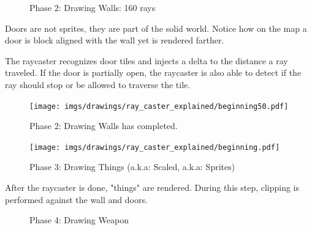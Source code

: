  
\begin{figure}[H]
 \centering
 \caption{Phase 2: Drawing Walls: 160 rays}  
\end{figure}
 \begin{minipage}{.4\textwidth}
 Doors are not sprites, they are part of the solid world. Notice how on the map a door is block aligned with the wall yet is rendered farther.\\
 \par
 The raycaster recognizes door tiles and injects a delta to the distance a ray traveled. If the door is partially open, the raycaster is also able to detect if the ray should stop or be allowed to traverse the tile.
 \end{minipage}
\begin{minipage}{.6\textwidth}
\begin{figure}[H]
  \centering
 \texttt{[image: imgs/drawings/ray\_caster\_explained/beginning50.pdf]}
   
\end{figure}
\end{minipage}



 
 \begin{figure}[H]
\centering
 \caption{Phase 2: Drawing Walls has completed.} 
 \end{figure}
\begin{minipage}{\textwidth}
\begin{figure}[H]
  \centering
 \texttt{[image: imgs/drawings/ray\_caster\_explained/beginning.pdf]}
   
\end{figure}
\end{minipage}




 
 
 \begin{figure}[H]
\centering
 \caption{Phase 3: Drawing Things (a.k.a: Scaled, a.k.a: Sprites)} 
 \end{figure}
 After the raycaster is done, "things" are rendered. During this step, clipping is performed against the wall and doors.




 \begin{figure}[H]
\centering
 \caption{Phase 4: Drawing Weapon} 
 \end{figure}
 














